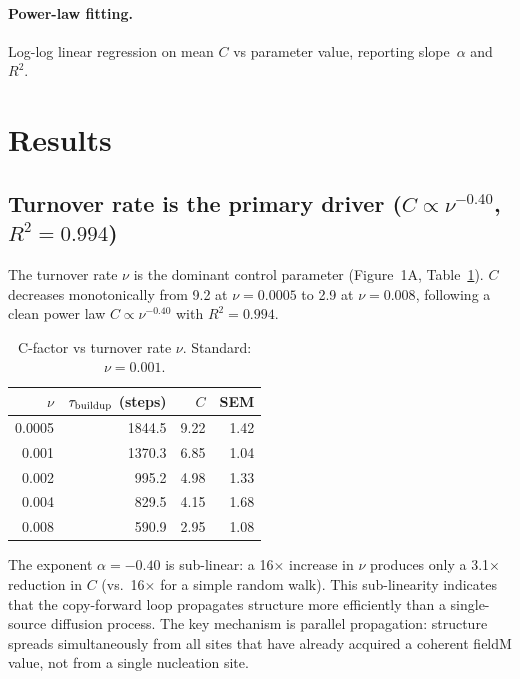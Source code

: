 \documentclass[11pt]{article}
\begin{document}
\paragraph{Power-law fitting.}
Log-log linear regression on mean $C$ vs parameter value, reporting slope~$\alpha$
and $R^2$.

\section{Results}

\subsection{Turnover rate is the primary driver ($C \propto \nu^{-0.40}$, $R^2=0.994$)}

The turnover rate $\nu$ is the dominant control parameter (Figure~1A, Table~\ref{tab:nu}).
$C$ decreases monotonically from 9.2 at $\nu=0.0005$ to 2.9 at $\nu=0.008$,
following a clean power law $C \propto \nu^{-0.40}$ with $R^2=0.994$.

\begin{table}[ht]
\centering
\caption{C-factor vs turnover rate $\nu$. Standard: $\nu=0.001$.}
\label{tab:nu}
\begin{tabular}{rrrr}
\toprule
$\nu$ & $\tau_{\rm buildup}$ (steps) & $C$ & SEM \\
\midrule
0.0005 & 1844.5 &  9.22 & 1.42 \\
0.001  & 1370.3 &  6.85 & 1.04 \\
0.002  &  995.2 &  4.98 & 1.33 \\
0.004  &  829.5 &  4.15 & 1.68 \\
0.008  &  590.9 &  2.95 & 1.08 \\
\bottomrule
\end{tabular}
\end{table}

The exponent $\alpha = -0.40$ is sub-linear: a 16$\times$ increase in $\nu$
produces only a 3.1$\times$ reduction in $C$ (vs.\ 16$\times$ for a simple
random walk).
This sub-linearity indicates that the copy-forward loop propagates structure
more efficiently than a single-source diffusion process.
The key mechanism is parallel propagation: structure spreads simultaneously
from all sites that have already acquired a coherent fieldM value,
not from a single nucleation site.
\end{document}
